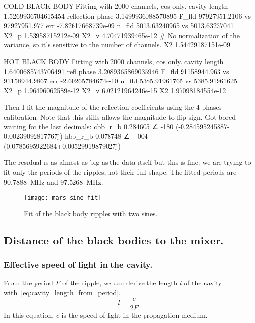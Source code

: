 COLD BLACK BODY
Fitting with 2000 channels, cos only.
cavity length     1.5269936704615454
reflection phase  3.1499936088570895
F_fld 97927951.2106 vs 97927951.977 err -7.82617668739e-09
n_fld 5013.63240965 vs 5013.63237041
X2_p 1.53958715212e-09
X2_v 4.70471939465e-12  # No normalization of the variance, so it's sensitive to the number of channels.
X2   1.54429187151e-09

HOT BLACK BODY
Fitting with 2000 channels, cos only.
cavity length  1.6400685743706491
refl phase     3.2089365869035946
F_fld 91158944.963 vs 91158944.9867 err -2.60265784674e-10
n_fld 5385.91961765 vs 5385.91961625
X2_p 1.96496062589e-12
X2_v 6.02121964246e-15
X2   1.97098184554e-12

Then I fit the magnitude of the reflection coefficients using the 4-phases calibration.
Note that this stills allows the magnitude to flip sign.
Got bored waiting for the last decimals:
cbb_r_b 0.284605 ∠ -180 (-0.284595245887-0.00239092817767j)
hbb_r_b 0.078748 ∠ +004 (0.0785695922684+0.00529919879027j)


The residual is as almost as big as the data itself but this is fine:
we are trying to fit only the periods of the ripples, not their full shape.
The fitted periods are \SI{90.7888}{\mega\hertz} and \SI{97.5268}{\mega\hertz}.
\begin{figure}
    \texttt{[image: mars\_sine\_fit]}
    \caption{Fit of the black body ripples with two sines.}
    \label{fig:mars_sine_fit}
\end{figure}



\subsection{Distance of the black bodies to the mixer.}

\subsubsection{Effective speed of light in the cavity.}
\label{sec:effective_speed_of_light}
From the period $F$ of the ripple, we can derive the length $l$ of the cavity with~\cref{eq:cavity_length_from_period}.
\begin{equation}
    l = \frac{c}{2F} \label{eq:cavity_length_from_period}
\end{equation}
In this equation, $c$ is the speed of light in the propagation medium.

